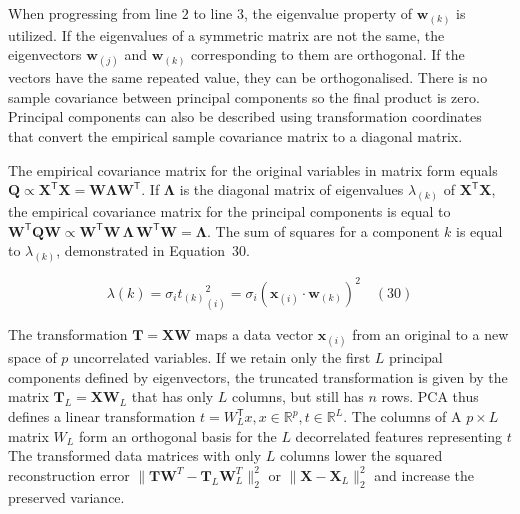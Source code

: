 \documentclass[preprint,12pt]{elsarticle}
\begin{document}
When progressing from line $2$ to line $3$, the eigenvalue property of $\mathbf{w}_{\left(k\right)}$ is utilized. If the eigenvalues of a symmetric matrix are not the same, the eigenvectors $\mathbf{w}_{\left(j\right)}$ and $\mathbf{w}_{\left(k\right)}$ corresponding to them are orthogonal. If the vectors have the same repeated value, they can be orthogonalised. There is no sample covariance between principal components so the final product is zero. Principal components can also be described using transformation coordinates that convert the empirical sample covariance matrix to a diagonal matrix.

The empirical covariance matrix for the original variables in matrix form equals $\mathbf{Q} \propto \mathbf{X}^{\mathsf{T}}\mathbf{X} =\mathbf{W} \mathbf{\Lambda} \mathbf{W}^{\mathsf{T}}$. If $\mathbf{\Lambda}$ is the diagonal matrix of eigenvalues $\lambda_{\left(k\right)}$ of $\mathbf{X}^{\mathsf{T}}\mathbf{X}$, the empirical covariance matrix for the principal components is equal to $\mathbf{W}^{\mathsf{T}}\mathbf{Q} \mathbf{W} \propto \mathbf{W}^{\mathsf{T}}\mathbf{W} \,\mathbf{\Lambda} \,\mathbf{W}^{\mathsf{T}}\mathbf{W} =\mathbf{\Lambda}$. The sum of squares for a component $k$ is equal to $\lambda_{\left(k\right)}$, demonstrated in Equation~30.

\begin{equation}
	\lambda(k) = \sigma_{i} {t_{\left(k\right)}}^{2}_{\left(i\right)} = \sigma_{i} {\left(\mathbf{x}_{\left(i\right)} \cdot \mathbf{w}_{\left(k\right)}\right)}^{2}
	\quad\left(30\right)
\end{equation}

The transformation $\mathbf{T} = \mathbf{X} \mathbf{W}$ maps a data vector $\mathbf{x}_{\left(i\right)}$ from an original to a new space of $p$ uncorrelated variables. If we retain only the first $L$ principal components defined by eigenvectors, the truncated transformation is given by the matrix $\mathbf{T}_{L}=\mathbf{X} \mathbf{W}_{L}$ that has only $L$ columns, but still has $n$ rows. PCA thus defines a linear transformation $t=W_{L}^{\mathsf{T}}x,x\in \mathbb{R}^{p},t\in \mathbb{R}^{L}$. The columns of A $p \times L$ matrix $W_{L}$ form an orthogonal basis for the $L$ decorrelated features representing $t$ \cite{bengio2013representation} The transformed data matrices with only $L$ columns lower the squared reconstruction error $\|\mathbf{T} \mathbf{W}^{T}-\mathbf{T}_{L}\mathbf{W}_{L}^{T}\|_{2}^{2}$ or  $\|\mathbf{X} -\mathbf{X}_{L}\|_{2}^{2}$ and increase the preserved variance.
\end{document}
